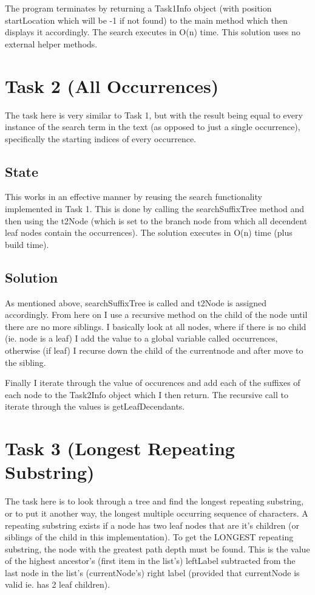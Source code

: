 \documentclass[12pt]{article} %
\begin{document}
The program terminates by returning a Task1Info object (with position startLocation which will be
-1 if not found) to the main method which then displays it accordingly. The search executes in O(n)
time. This solution uses no external helper methods.
\newpage
\section{Task 2 (All Occurrences)}
The task here is very similar to Task 1, but with the result being equal to every instance of the
search term in the text (as opposed to just a single occurrence), specifically the starting indices
of every occurrence.
\label{task2}
\subsection{State}
This works in an effective manner by reusing the search functionality implemented in Task 1. This
is done by calling the searchSuffixTree method and then using the t2Node (which is set to the
branch node from which all decendent leaf nodes contain the occurrences). The solution executes in
O(n) time (plus build time).
\subsection{Solution}
As mentioned above, searchSuffixTree is called and t2Node is assigned accordingly. From here on I
use a recursive method on the child of the node until there are no more siblings. I basically look
at all nodes, where if there is no child (ie. node is a leaf) I add the value to a global variable
called occurrences, otherwise (if leaf) I recurse down the child of the currentnode and after move
to the sibling.

Finally I iterate through the value of occurences and add each of the suffixes of each node to the
Task2Info object which I then return. The recursive call to iterate through the values is
getLeafDecendants.
\newpage
\section{Task 3 (Longest Repeating Substring)}
\label{sec:t3}
The task here is to look through a tree and find the longest repeating substring, or to put it
another way, the longest multiple occurring sequence of characters. A repeating substring exists if
a node has two leaf nodes that are it's children (or siblings of the child in this implementation).
To get the LONGEST repeating substring, the node with the greatest path depth must be
found. This is the value of the highest ancestor's (first item in the list's) leftLabel subtracted
from the last node in the list's (currentNode's) right label (provided that currentNode is valid ie.
has 2 leaf children). 
\end{document}
